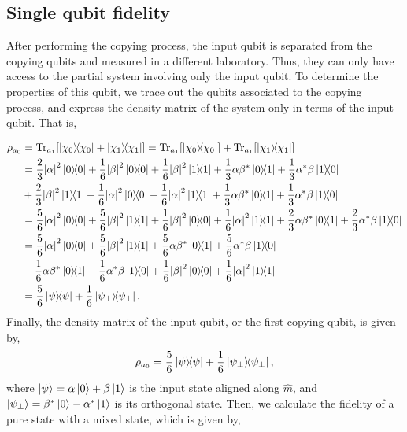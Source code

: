 \subsection{Single qubit fidelity}

After performing the copying process, the input qubit is separated from the copying qubits and measured in a different laboratory. Thus, they can only have access to the partial system involving only the input qubit. To determine the properties of this qubit, we trace out the qubits associated to the copying process, and express the density matrix of the system only in terms of the input qubit. That is,

\begin{align*}
    \rho_{a_0}&=\Tr_{a_1}[\ketbra{\chi_0}{\chi_0}+\ketbra{\chi_1}{\chi_1}]=\Tr_{a_1}[\ketbra{\chi_0}{\chi_0}]+\Tr_{a_1}[\ketbra{\chi_1}{\chi_1}]\\
    &=\frac{2}{3}\abs{\alpha}^2\ketbra{0}{0}+\frac{1}{6}\abs{\beta}^2\ketbra{0}{0}+\frac{1}{6}\abs{\beta}^2\ketbra{1}{1}+\frac{1}{3}\alpha\beta^*\ketbra{0}{1}+\frac{1}{3}\alpha^*\beta\ketbra{1}{0}\\
    &+\frac{2}{3}\abs{\beta}^2\ketbra{1}{1}+\frac{1}{6}\abs{\alpha}^2\ketbra{0}{0}+\frac{1}{6}\abs{\alpha}^2\ketbra{1}{1}+\frac{1}{3}\alpha\beta^*\ketbra{0}{1}+\frac{1}{3}\alpha^*\beta\ketbra{1}{0}\\
    &=\frac{5}{6}\abs{\alpha}^2\ketbra{0}{0}+\frac{5}{6}\abs{\beta}^2\ketbra{1}{1}+\frac{1}{6}\abs{\beta}^2\ketbra{0}{0}+\frac{1}{6}\abs{\alpha}^2\ketbra{1}{1}+\frac{2}{3}\alpha\beta^*\ketbra{0}{1}+\frac{2}{3}\alpha^*\beta\ketbra{1}{0}\\
    &=\frac{5}{6}\abs{\alpha}^2\ketbra{0}{0}+\frac{5}{6}\abs{\beta}^2\ketbra{1}{1}+\frac{5}{6}\alpha\beta^*\ketbra{0}{1}+\frac{5}{6}\alpha^*\beta\ketbra{1}{0}\\
    &-\frac{1}{6}\alpha\beta^*\ketbra{0}{1}-\frac{1}{6}\alpha^*\beta\ketbra{1}{0}+\frac{1}{6}\abs{\beta}^2\ketbra{0}{0}+\frac{1}{6}\abs{\alpha}^2\ketbra{1}{1}\\
    &=\frac{5}{6}\ketbra{\psi}{\psi}+\frac{1}{6}\ketbra{\psi_{\perp}}{\psi_{\perp}}.
\end{align*}
Finally, the density matrix of the input qubit, or the first copying qubit, is given by,
\begin{equation}
\rho_{a_0}=\frac{5}{6}\ketbra{\psi}{\psi}+\frac{1}{6}\ketbra{\psi_{\perp}}{\psi_{\perp}},
\end{equation}
where $\ket{\psi}=\alpha\ket{0}+\beta\ket{1}$ is the input state aligned along $\hat{m}$, and $\ket{\psi_{\perp}}=\beta^*\ket{0}-\alpha^*\ket{1}$ is its orthogonal state. Then, we calculate the fidelity of a pure state with a mixed state, which is given by,
